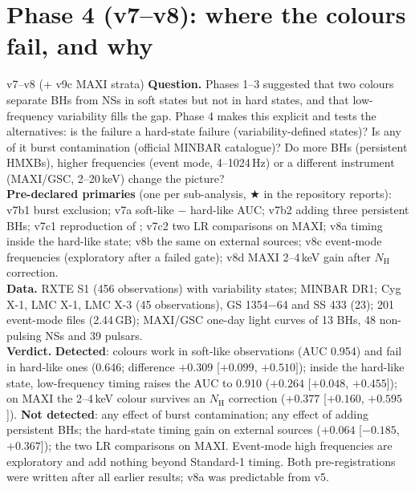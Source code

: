 \chapter{Phase 4 (v7--v8): where the colours fail, and why}\label{ch:phase4}

\begin{glance}{v7--v8 (+ v9c MAXI strata)}
\textbf{Question.} Phases 1--3 suggested that two colours separate BHs from NSs in soft states but not in hard states,
and that low-frequency variability fills the gap. Phase 4 makes this explicit and tests the alternatives: is the failure
a hard-state failure (variability-defined states)? Is any of it burst contamination (official MINBAR catalogue)? Do more
BHs (persistent HMXBs), higher frequencies (event mode, 4--1024\,Hz) or a different instrument (MAXI/GSC, 2--20\,keV)
change the picture? \\
\textbf{Pre-declared primaries} (one per sub-analysis, $\bigstar$ in the repository reports): v7b1 burst exclusion; v7a
soft-like $-$ hard-like AUC; v7b2 adding three persistent BHs; v7c1 reproduction of \citet{deBeurs2022}; v7c2 two LR
comparisons on MAXI; v8a timing inside the hard-like state; v8b the same on external sources; v8c event-mode
frequencies (exploratory after a failed gate); v8d MAXI 2--4\,keV gain after $N_\mathrm{H}$ correction. \\
\textbf{Data.} RXTE S1 (456 observations) with variability states; MINBAR DR1; Cyg X-1, LMC X-1, LMC X-3 (45 observations),
GS 1354$-$64 and SS 433 (23); 201 event-mode files (2.44\,GB); MAXI/GSC one-day light curves of 13 BHs, 48 non-pulsing
NSs and 39 pulsars. \\
\textbf{Verdict.} \textbf{Detected}: colours work in soft-like observations (AUC 0.954) and fail in hard-like ones (0.646;
difference $+0.309$ [$+0.099$, $+0.510]$); inside the hard-like state, low-frequency timing raises the AUC to 0.910
($+0.264$ [$+0.048$, $+0.455$]); on MAXI the 2--4\,keV colour survives an $N_\mathrm{H}$ correction ($+0.377$
[$+0.160$, $+0.595$]). \textbf{Not detected}: any effect of burst contamination; any effect of adding persistent BHs; the
hard-state timing gain on external sources ($+0.064$ [$-0.185$, $+0.367$]); the two LR comparisons on MAXI. Event-mode
high frequencies are exploratory and add nothing beyond Standard-1 timing. Both pre-registrations were written after all
earlier results; v8a was predictable from v5.
\end{glance}

